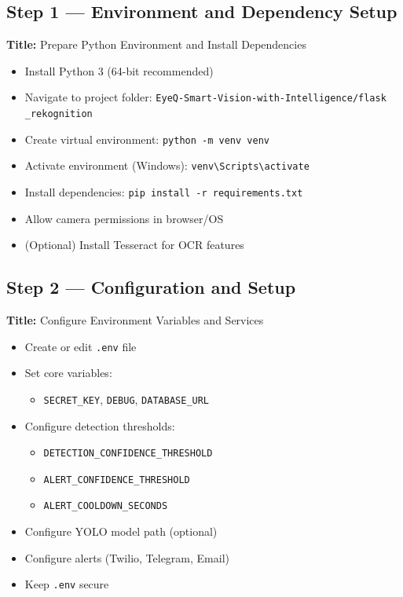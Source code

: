 \documentclass[10pt,openany]{report}
\begin{document}
\begin{sloppypar}
{{{\begin{sloppypar}
\subsection{Step 1 — Environment and Dependency Setup}
\textbf{Title:} Prepare Python Environment and Install Dependencies

\begin{itemize}
    \item Install Python 3 (64-bit recommended)
    \item Navigate to project folder:
    \texttt{EyeQ-Smart-Vision-with-Intelligence/flask\\\_rekognition}
    \item Create virtual environment:
    \texttt{python -m venv venv}
    \item Activate environment (Windows):
    \texttt{venv\textbackslash Scripts\textbackslash activate}
    \item Install dependencies:
    \texttt{pip install -r requirements.txt}
    \item Allow camera permissions in browser/OS
    \item (Optional) Install Tesseract for OCR features
\end{itemize}

\subsection{Step 2 — Configuration and Setup}
\textbf{Title:} Configure Environment Variables and Services

\begin{itemize}
    \item Create or edit \texttt{.env} file
    \item Set core variables:
    \begin{itemize}
        \item \texttt{SECRET\_KEY}, \texttt{DEBUG}, \texttt{DATABASE\_URL}
    \end{itemize}
    \item Configure detection thresholds:
    \begin{itemize}
        \item \texttt{DETECTION\_CONFIDENCE\_THRESHOLD}
        \item \texttt{ALERT\_CONFIDENCE\_THRESHOLD}
        \item \texttt{ALERT\_COOLDOWN\_SECONDS}
    \end{itemize}
    \item Configure YOLO model path (optional)
    \item Configure alerts (Twilio, Telegram, Email)
    \item Keep \texttt{.env} secure
\end{itemize}


\end{sloppypar}}}}
\end{sloppypar}
\end{document}
